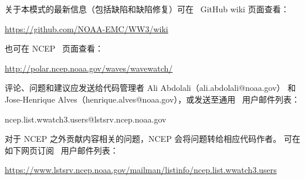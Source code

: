 \vspace{\baselineskip} \noindent
关于本模式的最新信息（包括缺陷和缺陷修复）可在 \ws\ GitHub wiki 页面查看：
\begin{center}
\url{https://github.com/NOAA-EMC/WW3/wiki}
\end{center}
也可在 NCEP \ws\ 页面查看：
\begin{center}
\url{http://polar.ncep.noaa.gov/waves/wavewatch/}
\end{center}
评论、问题和建议应发送给代码管理者 Ali Abdolali（ali.abdolali@noaa.gov）
和 Jose-Henrique Alves（henrique.alves@noaa.gov），或发送至通用 \ws\ 用户邮件列表：

\begin{center}
ncep.list.wwatch3.users@lstsrv.ncep.noaa.gov
\end{center}

\noindent
对于 NCEP 之外贡献内容相关的问题，NCEP 会将问题转给相应代码作者。
可在如下网页订阅 \ws\ 用户邮件列表：
\begin{center}
\footnotesize
\url{https://www.lstsrv.ncep.noaa.gov/mailman/listinfo/ncep.list.wwatch3.users}
\end{center}

\nocite{tol:OMOD02b}
\nocite{tol:PACO02}
\nocite{tol:GAOS02}
\nocite{tol:OMB02b}
\nocite{tol:OMB02c}

